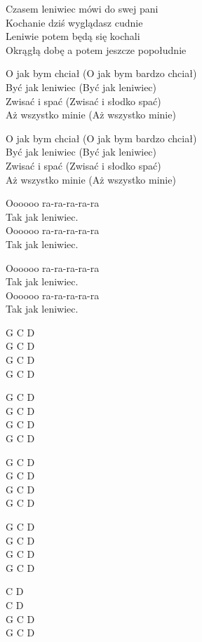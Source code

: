 \begin{text}
Czasem leniwiec mówi do swej pani\\
Kochanie dziś wyglądasz cudnie\\
Leniwie potem będą się kochali\\
Okrągłą dobę a potem jeszcze popołudnie

O jak bym chciał (O jak bym bardzo chciał)\\
Być jak leniwiec (Być jak leniwiec)\\
Zwisać i spać (Zwisać i słodko spać)\\
Aż wszystko minie (Aż wszystko minie)

O jak bym chciał (O jak bym bardzo chciał)\\
Być jak leniwiec (Być jak leniwiec)\\
Zwisać i spać (Zwisać i słodko spać)\\
Aż wszystko minie (Aż wszystko minie)

Oooooo ra-ra-ra-ra-ra\\
Tak jak leniwiec.\\
Oooooo ra-ra-ra-ra-ra\\
Tak jak leniwiec.

Oooooo ra-ra-ra-ra-ra\\
Tak jak leniwiec.\\
Oooooo ra-ra-ra-ra-ra\\
Tak jak leniwiec.
\end{text}
\begin{chord}
G C D\\
G C D\\
G C D\\
G C D

G C D\\
G C D\\
G C D\\
G C D

G C D\\
G C D\\
G C D\\
G C D

G C D\\
G C D\\
G C D\\
G C D

    \hfill\break
    \hfill\break
    \hfill\break
    \hfill\break

    \hfill\break
    \hfill\break
    \hfill\break
    \hfill\break

    \hfill\break
    \hfill\break
    \hfill\break
    \hfill\break

    \hfill\break
    \hfill\break
    \hfill\break
    \hfill\break

    \hfill\break
    \hfill\break
    \hfill\break
    \hfill\break

C D\\
C D\\
G C D\\
G C D
\end{chord}
